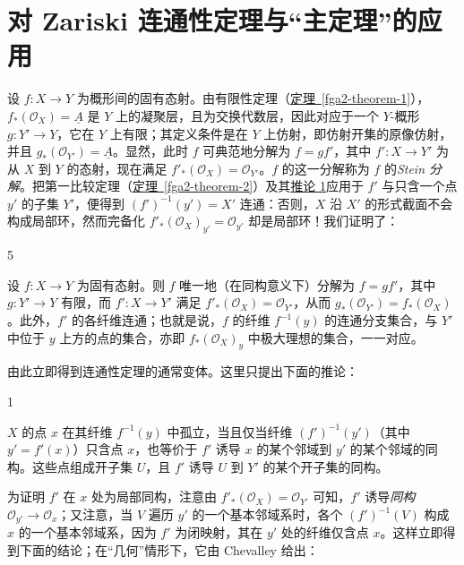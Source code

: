 \chapter{对 Zariski 连通性定理与“主定理”的应用}\thispagestyle{fancy}\label{fga2-4}
\par{}设 \(f\colon  X\to  Y\) 为概形间的固有态射。由有限性定理（\hyperref[fga2-theorem-1]{定理~\ref*{fga2-theorem-1}}），\(f_*(\mathcal {O}_X)=\underline {A}\) 是 \(Y\) 上的凝聚层，且为交换代数层，因此对应于一个 \(Y\)-概形 \(g\colon  Y'\to  Y\)，它在 \(Y\) 上有限；其定义条件是在 \(Y\) 上仿射，即仿射开集的原像仿射，并且 \(g_*(\mathcal {O}_{Y'})=\underline {A}\)。显然，此时 \(f\) 可典范地分解为 \(f=gf'\)，其中 \(f'\colon  X\to  Y'\) 为从 \(X\) 到 \(Y\) 的态射，现在满足 \(f'_*(\mathcal {O}_X)=\mathcal {O}_{Y'}\)。\(f\) 的这一分解称为 \(f\) 的\emph{Stein 分解}。把第一比较定理（\hyperref[fga2-theorem-2]{定理~\ref*{fga2-theorem-2}}）及其\hyperref[fga2-theorem-2-corollary-1]{推论 1}应用于 \(f'\) 与只含一个点 \(y'\) 的子集 \(Y'\)，便得到 \((f')^{-1}(y')=X'\) 连通：否则，\(X\) 沿 \(X'\) 的形式截面不会构成局部环，然而完备化 \(f'_*(\mathcal {O}_X)_{y'}=\mathcal {O}_{y'}\) 却是局部环！我们证明了：
\begin{theorem}{5}\label{fga2-theorem-5}\skipsinglepar
\par{}设 \(f\colon  X\to  Y\) 为固有态射。则 \(f\) 唯一地（在同构意义下）分解为 \(f=gf'\)，其中 \(g\colon  Y'\to  Y\) 有限，而 \(f'\colon  X\to  Y'\) 满足 \(f'_*(\mathcal {O}_X)=\mathcal {O}_{Y'}\)，从而 \(g_*(\mathcal {O}_{Y'})=f_*(\mathcal {O}_X)\)。此外，\(f'\) 的各纤维连通；也就是说，\(f\) 的纤维 \(f^{-1}(y)\) 的连通分支集合，与 \(Y'\) 中位于 \(y\) 上方的点的集合，亦即 \(f_*(\mathcal {O}_X)_y\) 中极大理想的集合，一一对应。\end{theorem}
\par{}由此立即得到连通性定理的通常变体。这里只提出下面的推论：
\begin{corollary}{1}\label{fga2-theorem-5-corollary-1}\skipsinglepar
\par{}\(X\) 的点 \(x\) 在其纤维 \(f^{-1}(y)\) 中孤立，当且仅当纤维 \((f')^{-1}(y')\)（其中 \(y'=f'(x)\)）只含点 \(x\)，也等价于 \(f'\) 诱导 \(x\) 的某个邻域到 \(y'\) 的某个邻域的同构。这些点组成开子集 \(U\)，且 \(f'\) 诱导 \(U\) 到 \(Y'\) 的某个开子集的同构。\end{corollary}
\par{}为证明 \(f'\) 在 \(x\) 处为局部同构，注意由 \(f'_*(\mathcal {O}_X)=\mathcal {O}_{Y'}\) 可知，\(f'\) 诱导\emph{同构} \(\mathcal {O}_{y'}\to \mathcal {O}_x\)；又注意，当 \(V\) 遍历 \(y'\) 的一个基本邻域系时，各个 \((f')^{-1}(V)\) 构成 \(x\) 的一个基本邻域系，因为 \(f'\) 为闭映射，其在 \(y'\) 处的纤维仅含点 \(x\)。这样立即得到下面的结论；在“几何”情形下，它由 Chevalley 给出：

